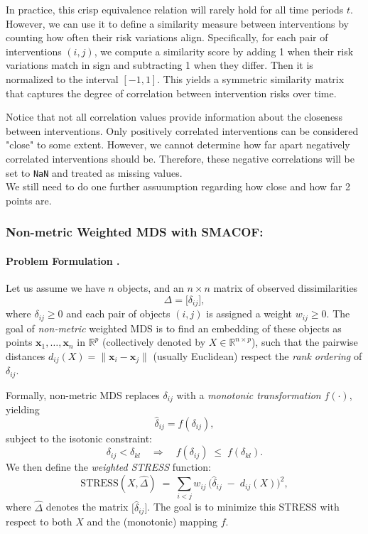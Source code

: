 In practice, this crisp equivalence relation will rarely hold for all time periods $t$. However, we can use it to define a similarity measure between interventions by counting how often their risk variations align. Specifically, for each pair of interventions $(i,j)$, we compute a similarity score by adding 1 when their risk variations match in sign and subtracting 1 when they differ. Then it is normalized to the interval $[-1,1]$. This yields a symmetric similarity matrix that captures the degree of correlation between intervention risks over time.
    
Notice that not all correlation values provide information about the closeness between interventions. Only positively correlated interventions can be considered "close" to some extent. However, we cannot determine how far apart negatively correlated interventions should be. Therefore, these negative correlations will be set to \texttt{NaN} and treated as missing values.\\

We still need to do one further assuumption regarding how close and how far 2 points are. 

\subsubsection*{Non-metric Weighted MDS with SMACOF:}
\paragraph{Problem Formulation .} Let us assume we have $n$ objects, and an $n\times n$ matrix of observed dissimilarities 
\[
\Delta = \bigl[\delta_{ij}\bigr],
\]
where $\delta_{ij} \ge 0$ and each pair of objects $(i,j)$ is assigned a weight $w_{ij}\ge 0$. The goal of \emph{non-metric} weighted MDS is to find an embedding of these objects as points $\mathbf{x}_1,\dots,\mathbf{x}_n$ in $\mathbb{R}^p$ (collectively denoted by $X \in \mathbb{R}^{n\times p}$), such that the pairwise distances $d_{ij}(X) = \|\mathbf{x}_i - \mathbf{x}_j\|$ (usually Euclidean) respect the \emph{rank ordering} of $\delta_{ij}$.

Formally, non-metric MDS replaces $\delta_{ij}$ with a \emph{monotonic transformation} $f(\cdot)$, yielding
\[
\hat{\delta}_{ij} = f(\delta_{ij}),
\]
subject to the isotonic constraint:
\[
\delta_{ij} < \delta_{kl} 
\quad \Longrightarrow \quad 
f(\delta_{ij}) \;\le\; f(\delta_{kl}).
\]
We then define the \emph{weighted STRESS} function:
\[
\mathrm{STRESS}(X,\hat{\Delta}) 
\;=\;
\sum_{i<j} w_{ij}\,\bigl(\hat{\delta}_{ij} \;-\; d_{ij}(X)\bigr)^2,
\]
where $\hat{\Delta}$ denotes the matrix $\bigl[\hat{\delta}_{ij}\bigr]$.  
The goal is to minimize this STRESS with respect to both $X$ and the (monotonic) mapping $f$.

